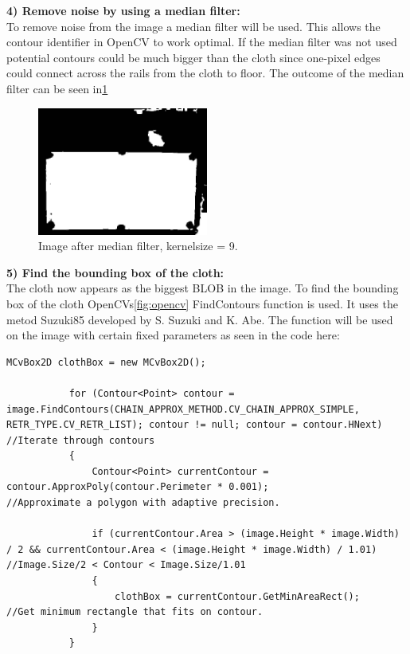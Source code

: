 \textbf{4) Remove noise by using a median filter:}\\
To remove noise from the image a median filter will be used. This allows the contour identifier in OpenCV\cite{opencv} to work optimal. If the median filter was not used potential contours could be much bigger than the cloth since one-pixel edges could connect across the rails from the cloth to floor. The outcome of the median filter can be seen in\ref{fig:afterclothmedian}

\begin{figure}[H]
\begin{center}
\leavevmode
\includegraphics[width=0.5\textwidth]{images/afterclothmedian}
\end{center}
\caption{Image after median filter, kernelsize = 9.}
\label{fig:afterclothmedian}
\end{figure}

\textbf{5) Find the bounding box of the cloth:}\\
The cloth now appears as the biggest BLOB in the image. To find the bounding box of the cloth OpenCVs\ref{fig:opencv} FindContours function is used. It uses the metod Suzuki85 developed by S. Suzuki and K. Abe\cite{contour}. The function will be used on the image with certain fixed parameters as seen in the code here:

\begin{lstlisting}
MCvBox2D clothBox = new MCvBox2D();

           for (Contour<Point> contour = image.FindContours(CHAIN_APPROX_METHOD.CV_CHAIN_APPROX_SIMPLE, RETR_TYPE.CV_RETR_LIST); contour != null; contour = contour.HNext)  //Iterate through contours
           {
               Contour<Point> currentContour = contour.ApproxPoly(contour.Perimeter * 0.001);                                           //Approximate a polygon with adaptive precision.

               if (currentContour.Area > (image.Height * image.Width) / 2 && currentContour.Area < (image.Height * image.Width) / 1.01)  //Image.Size/2 < Contour < Image.Size/1.01
               {
                   clothBox = currentContour.GetMinAreaRect();                                                                          //Get minimum rectangle that fits on contour.
               }
           }
\end{lstlisting}

